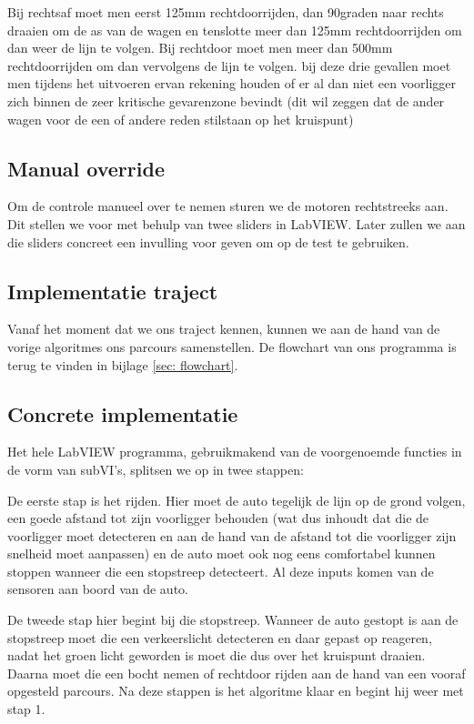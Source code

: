 \documentclass[a4paper,twoside,kulak]{kulakreport}
\begin{document}
	Bij rechtsaf moet men eerst 125mm rechtdoorrijden, dan 90graden naar rechts draaien om de as van de wagen en tenslotte meer dan 125mm rechtdoorrijden om dan weer de lijn te volgen. Bij rechtdoor moet men meer dan 500mm rechtdoorrijden om dan vervolgens de lijn te volgen. bij deze drie gevallen moet men tijdens het uitvoeren ervan rekening houden of er al dan niet een voorligger zich binnen de zeer kritische gevarenzone bevindt (dit wil zeggen dat de ander wagen voor de een of andere reden stilstaan op het kruispunt)
	
	\subsection{Manual override}
		Om de controle manueel over te nemen sturen we de motoren rechtstreeks aan. Dit stellen we voor met behulp van twee sliders in LabVIEW. Later zullen we aan die sliders concreet een invulling voor geven om op de test te gebruiken.
	
	\subsection{Implementatie traject}
	
	Vanaf het moment dat we ons traject kennen, kunnen we aan de hand van de vorige algoritmes ons parcours samenstellen. De flowchart van ons programma is terug te vinden in bijlage \ref{sec: flowchart}.
	
	\subsection{Concrete implementatie}
	Het hele LabVIEW programma, gebruikmakend van de voorgenoemde functies in de vorm van subVI's, splitsen we op in twee stappen:\bigskip
	
	De eerste stap is het rijden. Hier moet de auto tegelijk de lijn op de grond volgen, een goede afstand tot zijn voorligger behouden (wat dus inhoudt dat die de voorligger moet detecteren en aan de hand van de afstand tot die voorligger zijn snelheid moet aanpassen) en de auto moet ook nog eens comfortabel kunnen stoppen wanneer die een stopstreep detecteert. Al deze inputs komen van de sensoren aan boord van de auto.\bigskip
	
	De tweede stap hier begint bij die stopstreep. Wanneer de auto gestopt is aan de stopstreep moet die een verkeerslicht detecteren en daar gepast op reageren, nadat het groen licht geworden is moet die dus over het kruispunt draaien. Daarna moet die een bocht nemen of rechtdoor rijden aan de hand van een vooraf opgesteld parcours. Na deze stappen is het algoritme klaar en begint hij weer met stap 1.\bigskip
	
\end{document}
